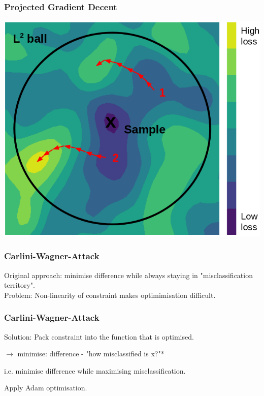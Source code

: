 \documentclass[10pt,usepdftitle=false,aspectratio=169]{beamer}
\begin{document}
\begin{frame}[fragile]
	\frametitle{Projected Gradient Decent}
	
	\begin{center}
		\includegraphics[height=0.75 	\textheight]{plots/pgd_pic.png}
	\end{center}

\end{frame}


\begin{frame}[fragile]
	\frametitle{Carlini-Wagner-Attack}
	
	\large Original approach: minimise difference while always staying in "misclassification territory". \\
	
	\medskip
	Problem: Non-linearity of constraint makes optimimisation difficult.
	
\end{frame}

\begin{frame}[fragile]
	\frametitle{Carlini-Wagner-Attack}
	
	\large Solution: Pack constraint into the function that is optimised.\\
	
	\bigskip
	
	$\rightarrow$ minimise: difference - "how misclassified is x?"*\\
	\smallskip
	
	i.e. minimise difference while maximising misclassification.\\
	\bigskip
	
	Apply Adam optimisation.
	
\end{frame}
\end{document}

